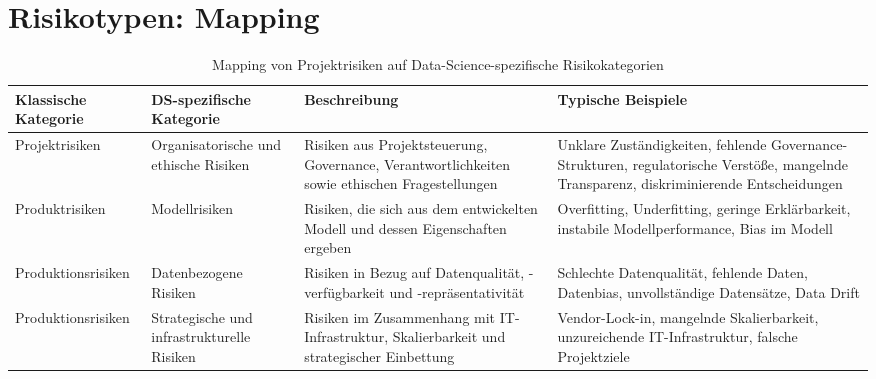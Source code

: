\section{Risikotypen: Mapping}
\begin{table}[H]
\centering

\label{tab:risk_mapping}
\begin{tabular}{p{3cm} p{3.5cm} p{4cm} p{5cm}}
\hline
\textbf{Klassische Kategorie} & \textbf{DS-spezifische Kategorie} & \textbf{Beschreibung} & \textbf{Typische Beispiele} \\
\hline

Projektrisiken 
& Organisatorische und ethische Risiken 
& Risiken aus Projektsteuerung, Governance, Verantwortlichkeiten sowie ethischen Fragestellungen 
& Unklare Zuständigkeiten, fehlende Governance-Strukturen, regulatorische Verstöße, mangelnde Transparenz, diskriminierende Entscheidungen \\

\hline

Produktrisiken 
& Modellrisiken 
& Risiken, die sich aus dem entwickelten Modell und dessen Eigenschaften ergeben 
& Overfitting, Underfitting, geringe Erklärbarkeit, instabile Modellperformance, Bias im Modell \\

\hline

Produktionsrisiken 
& Datenbezogene Risiken 
& Risiken in Bezug auf Datenqualität, -verfügbarkeit und -repräsentativität 
& Schlechte Datenqualität, fehlende Daten, Datenbias, unvollständige Datensätze, Data Drift \\

\hline

Produktionsrisiken 
& Strategische und infrastrukturelle Risiken 
& Risiken im Zusammenhang mit IT-Infrastruktur, Skalierbarkeit und strategischer Einbettung 
& Vendor-Lock-in, mangelnde Skalierbarkeit, unzureichende IT-Infrastruktur, falsche Projektziele \\

\hline

\end{tabular}
\caption{Mapping von Projektrisiken auf Data-Science-spezifische Risikokategorien}
\end{table}